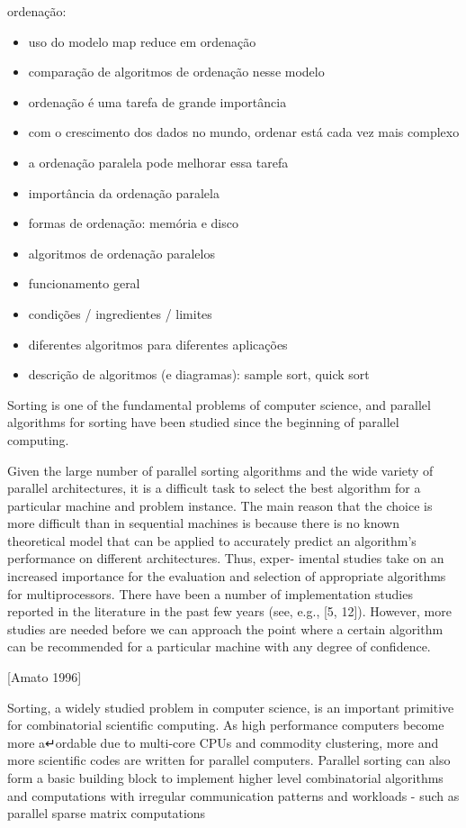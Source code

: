 ordenação:
\begin{itemize}
\item uso do modelo map reduce em ordenação 
\item comparação de algoritmos de ordenação nesse modelo
\item ordenação é uma tarefa de grande importância
\item com o crescimento dos dados no mundo, ordenar está cada vez mais complexo
\item a ordenação paralela pode melhorar essa tarefa
\item importância da ordenação paralela
\item formas de ordenação: memória e disco
\item algoritmos de ordenação paralelos
\item funcionamento geral 
\item condições / ingredientes / limites
\item diferentes algoritmos para diferentes aplicações
\item descrição de algoritmos (e diagramas): sample sort, quick sort
\end{itemize}

Sorting is one of the fundamental problems of computer science, and parallel algorithms for sorting have been studied since the beginning of parallel computing. 

Given the large number of parallel sorting algorithms and the wide variety of parallel architectures, it is a difficult task to select the best algorithm for a particular machine and problem instance. The main reason that the choice is more difficult than in sequential machines is because there is no known theoretical model that can be applied to accurately predict an algorithm’s performance on different architectures. Thus, exper- imental studies take on an increased importance for the evaluation and selection of appropriate algorithms for multiprocessors. There have been a number of implementation studies reported in the literature in the past few years (see, e.g., [5, 12]). However, more studies are needed before we can approach the point where a certain algorithm can be recommended for a particular machine with any degree of confidence.

[Amato 1996]

 Sorting, a widely studied problem in computer science, is an important primitive for combinatorial scientific computing. As high performance computers become more a↵ordable due to multi-core CPUs and commodity clustering, more and more scientific codes are written for parallel computers.
 Parallel sorting can also form a basic building block to implement higher level combinatorial algorithms and computations with irregular communication patterns and workloads - such as parallel sparse matrix computations 

